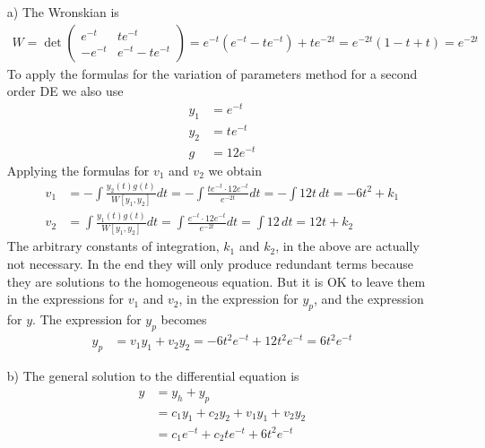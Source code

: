     \ifnum {} {\color{DarkBlue} 
    \begin{enumerate}
        \item[a)] The Wronskian is
    \begin{align}
        W = \det \begin{pmatrix} e^{-t}&te^{-t}\\-e^{-t}&e^{-t}-te^{-t}\end{pmatrix} = e^{-t}(e^{-t}-te^{-t})+te^{-2t} = e^{-2t}(1 -t+t) = e^{-2t}
    \end{align}
    To apply the formulas for the variation of parameters method for a second order DE we also use
    \begin{align}
        y_1 & = e^{-t} \\
        y_2 &= te^{-t} \\
        g &= 12e^{-t}
    \end{align}
    Applying the formulas for $v_1$ and $v_2$ we obtain
    \begin{align}
        v_1 &= - \int \frac{y_2(t)g(t)}{W[y_1,y_2]}dt = - \int \frac{te^{-t} \cdot 12e^{-t}}{e^{-2t}} dt = - \int 12t \, dt = -6t^2 + k_1\\
        v_2 &= \int \frac{y_1(t)g(t)}{W[y_1,y_2]} dt = \int \frac{e^{-t}\cdot12e^{-t}}{e^{-2t}} dt = \int 12 \, dt = 12t + k_2
    \end{align}
    The arbitrary constants of integration, $k_1$ and $k_2$, in the above are actually not necessary. In the end they will only produce redundant terms because they are solutions to the homogeneous equation. But it is OK to leave them in the expressions for $v_1$ and $v_2$, in the expression for $y_p$, and the expression for $y$. The expression for $y_p$ becomes
    \begin{align}
        y_p &= v_1y_1 + v_2y_2 
        = -6t^2 e^{-t} + 12t^2e^{-t} = 6t^2e^{-t}
    \end{align}
    \item [b)] The general solution to the differential equation is
    \begin{align}
        y &= y_h + y_p \\
        &= c_1y_1 + c_2y_2 + v_1y_1 + v_2y_2 \\
        &= c_1e^{-t} +c_2te^{-t} + 6t^2e^{-t}
    \end{align}
    \end{enumerate}
    } 
    \else 
    \fi    
\fi

